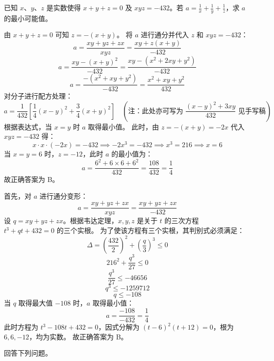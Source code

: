 \begin{questions}
\question
已知 $x$、$y$、$z$ 是实数使得 $x+y+z=0$ 及 $xyz=-432$。若 $a = \frac{1}{x} + \frac{1}{y} + \frac{1}{z}$，求 $a$ 的最小可能值。
\begin{solution}
由 $x+y+z=0$ 可知 $z = -(x+y)$。
将 $a$ 进行通分并代入 $z$ 和 $xyz = -432$：
\[ a = \frac{xy + yz + zx}{xyz} = \frac{xy + z(x+y)}{-432} \]
\[ a = \frac{xy - (x+y)^2}{-432} = \frac{xy - (x^2 + 2xy + y^2)}{-432} \]
\[ a = \frac{-(x^2 + xy + y^2)}{-432} = \frac{x^2 + xy + y^2}{432} \]
对分子进行配方处理：
\[ a = \frac{1}{432} \left[ \frac{1}{4}(x-y)^2 + \frac{3}{4}(x+y)^2 \right] \quad (\text{注：此处亦可写为 } \frac{(x-y)^2 + 3xy}{432} \text{ 见手写稿}) \]
根据表达式，当 $x=y$ 时 $a$ 取得最小值。
此时，由 $z = -(x+y) = -2x$ 代入 $xyz = -432$ 得：
\[ x \cdot x \cdot (-2x) = -432 \implies -2x^3 = -432 \implies x^3 = 216 \implies x = 6 \]
当 $x=y=6$ 时，$z=-12$，此时 $a$ 的最小值为：
\[ a = \frac{6^2 + 6 \times 6 + 6^2}{432} = \frac{108}{432} = \frac{1}{4} \]
故正确答案为 B。
\end{solution}
\begin{solution}
首先，对 $a$ 进行通分变形：
\[ a = \frac{xy + yz + zx}{xyz} = \frac{xy + yz + zx}{-432} \]
设 $q = xy + yz + zx$。根据韦达定理，$x, y, z$ 是关于 $t$ 的三次方程 $t^3 + qt + 432 = 0$ 的三个实根。
为了使该方程有三个实根，其判别式必须满足：
\[ \Delta = \left(\frac{432}{2}\right)^2 + \left(\frac{q}{3}\right)^3 \le 0 \]
\[ 216^2 + \frac{q^3}{27} \le 0 \]
\[ \frac{q^3}{27} \le -46656 \]
\[ q^3 \le -1259712 \]
\[ q \le -108 \]
当 $q$ 取得最大值 $-108$ 时，$a$ 取得最小值：
\[ a = \frac{-108}{-432} = \frac{1}{4} \]
此时方程为 $t^3 - 108t + 432 = 0$，因式分解为 $(t-6)^2(t+12)=0$，根为 $6, 6, -12$，均为实数。
故正确答案为 B。
\end{solution}

\question
回答下列问题。
\end{questions}
